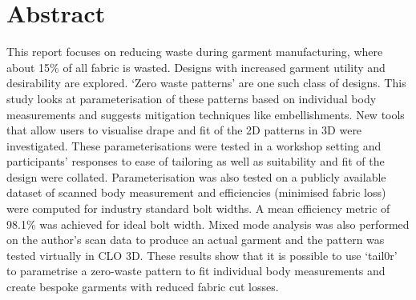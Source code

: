 \chapter*{Abstract}

This report focuses on reducing waste during garment manufacturing, where about 15\% of all fabric is wasted. Designs with increased garment utility and desirability are explored. ‘Zero waste patterns’ are one such class of designs. This study looks at parameterisation of these patterns based on individual body measurements and suggests mitigation techniques like embellishments. New tools that allow users to visualise drape and fit of the 2D patterns in 3D were investigated.
These parameterisations were tested in a workshop setting and participants' responses to ease of tailoring as well as suitability and fit of the design were collated. Parameterisation was also tested on a publicly available dataset of scanned body measurement and efficiencies (minimised fabric loss) were computed for industry standard bolt widths. A mean efficiency metric of 98.1\% was achieved for ideal bolt width.
Mixed mode analysis was also performed on the author's scan data to produce an actual garment and the pattern was tested virtually in CLO 3D.
These results show that it is possible to use `tail0r’ to parametrise a zero-waste pattern to fit individual body measurements and create bespoke garments with reduced fabric cut losses.